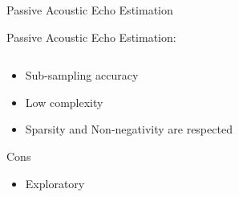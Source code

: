 \begin{frame}{Passive Acoustic Echo Estimation}
\begin{block}{\alert{Passive} Acoustic Echo Estimation:}
\begin{columns}[T,onlytextwidth]
\begin{column}{.48\textwidth}
\begin{itemize}
                    \item Sub-sampling accuracy
                    \item Low complexity
                    \item Sparsity and Non-negativity are respected
                \end{itemize}
                Cons
                \begin{itemize}
                    \item Exploratory
                \end{itemize}
            \end{column}%
        \end{columns}

    \end{block}

\end{frame}

